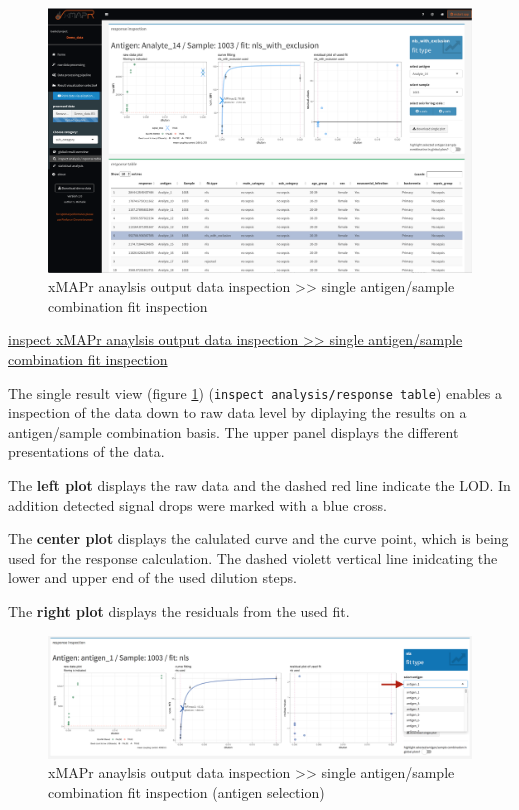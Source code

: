 \documentclass[
]{book}
\begin{document}
\begin{figure}
\includegraphics[width=50.5in]{figures/inspect_single_results} \caption{xMAPr anaylsis output data inspection >> single antigen/sample combination fit inspection}\label{fig:SingleResults}
\end{figure}

\href{figures/inspect_single_results.png}{inspect xMAPr anaylsis output data inspection \textgreater\textgreater{} single antigen/sample combination fit inspection}

The single result view (figure \ref{fig:SingleResults}) (\texttt{inspect\ analysis/response\ table}) enables a inspection of the data down to raw data level by diplaying the results on a antigen/sample combination basis. The upper panel displays the different presentations of the data.

The \textbf{left plot} displays the raw data and the dashed red line indicate the LOD. In addition detected signal drops were marked with a blue cross.

The \textbf{center plot} displays the calulated curve and the curve point, which is being used for the response calculation. The dashed violett vertical line inidcating the lower and upper end of the used dilution steps.

The \textbf{right plot} displays the residuals from the used fit.

\begin{figure}
\includegraphics[width=54.53in]{figures/inspect_single_results1} \caption{xMAPr anaylsis output data inspection >> single antigen/sample combination fit inspection (antigen selection)}\label{fig:SingleResults1}
\end{figure}
\end{document}
